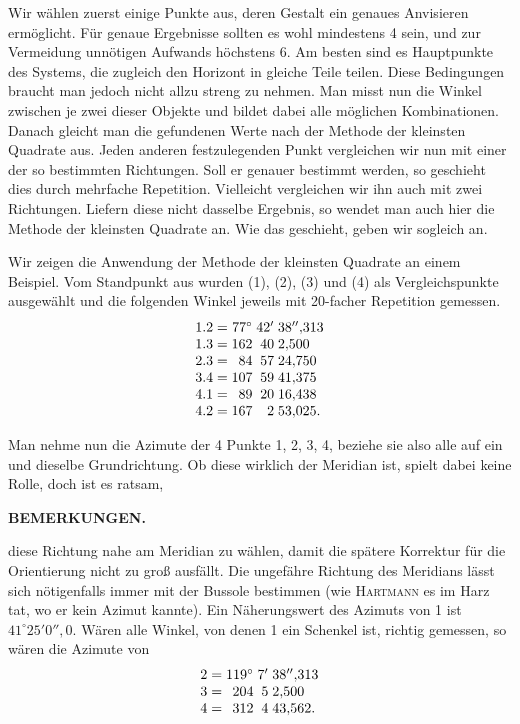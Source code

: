 Wir wählen zuerst einige Punkte aus, deren Gestalt ein genaues Anvisieren ermöglicht. Für genaue Ergebnisse sollten es wohl mindestens 4 sein, und zur Vermeidung unnötigen Aufwands höchstens 6. Am besten sind es Hauptpunkte des Systems, die zugleich den Horizont in gleiche Teile teilen. Diese Bedingungen braucht man jedoch nicht allzu streng zu nehmen. Man misst nun die Winkel zwischen je zwei dieser Objekte und bildet dabei alle möglichen Kombinationen. Danach gleicht man die gefundenen Werte nach der Methode der kleinsten Quadrate aus. Jeden anderen festzulegenden Punkt vergleichen wir nun mit einer der so bestimmten Richtungen. Soll er genauer bestimmt werden, so geschieht dies durch mehrfache Repetition. Vielleicht vergleichen wir ihn auch mit zwei Richtungen. Liefern diese nicht dasselbe Ergebnis, so wendet man auch hier die Methode der kleinsten Quadrate an. Wie das geschieht, geben wir sogleich an.

Wir zeigen die Anwendung der Methode der kleinsten Quadrate an einem Beispiel. Vom Standpunkt  aus wurden  (1),  (2),  (3) und  (4) als Vergleichspunkte ausgewählt und die folgenden Winkel jeweils mit 20-facher Repetition gemessen.
\[
\begin{array}{@{}r@{\;=\;}r@{\;}r@{\;}l@{}}
 1.2&77^\circ&42'&38''{,}313\\
 1.3&162&40&2{,}500\\
 2.3&84&57&24{,}750\\
 3.4&107&59&41{,}375\\
 4.1&89&20&16{,}438\\
 4.2&167&2&53{,}025.
\end{array}
\]

Man nehme nun die Azimute der 4 Punkte 1, 2, 3, 4, beziehe sie also alle auf ein und dieselbe Grundrichtung. Ob diese wirklich der Meridian ist, spielt dabei keine Rolle, doch ist es ratsam,
\par\smallskip\noindent{}\par

\par\clearpage
\noindent{}\hfill{\small\textbf{BEMERKUNGEN.}}\hfill\null\par\medskip

\noindent diese Richtung nahe am Meridian zu wählen, damit die spätere Korrektur für die Orientierung nicht zu groß ausfällt. Die ungefähre Richtung des Meridians lässt sich nötigenfalls immer mit der Bussole bestimmen (wie \textsc{Hartmann} es im Harz tat, wo er kein Azimut kannte). Ein Näherungswert des Azimuts von 1 ist \(41^\circ25'0''{,}0\). Wären alle Winkel, von denen 1 ein Schenkel ist, richtig gemessen, so wären die Azimute von
\[
\begin{array}{@{}r@{\;=\;}r@{\;}r@{\;}l@{}}
 2&119^\circ&7'&38''{,}313\\
 3&204&5&2{,}500\\
 4&312&4&43{,}562.
\end{array}
\]

